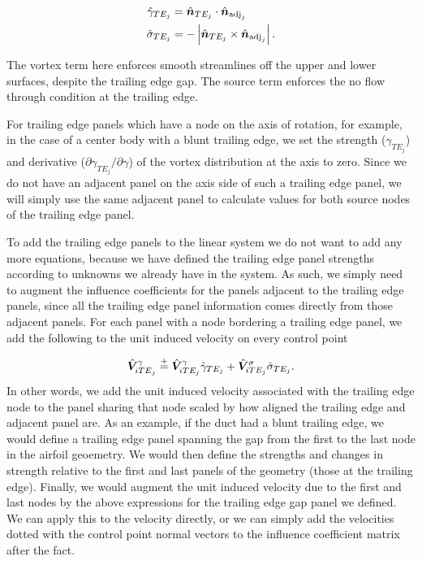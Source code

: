 \begin{align}
        \hat{\gamma}_{TE_j} &= \hat{\bm{n}}_{TE_j} \cdot \hat{\bm{n}}_{\text{adj}_j} \\
        \hat{\sigma}_{TE_j} &= -\left|\hat{\bm{n}}_{TE_j} \times \hat{\bm{n}}_{\text{adj}_j}\right|.
\end{align}

\noindent The vortex term here enforces smooth streamlines off the upper and lower surfaces, despite the trailing edge gap.
%
The source term enforces the no flow through condition at the trailing edge.

For trailing edge panels which have a node on the axis of rotation, for example, in the case of a center body with a blunt trailing edge, we set the strength (\(\gamma_{TE_j}\)) and derivative (\(\partial \gamma_{TE_j}/\partial \gamma\)) of the vortex distribution at the axis to zero.
%
Since we do not have an adjacent panel on the axis side of such a trailing edge panel, we will simply use the same adjacent panel to calculate values for both source nodes of the trailing edge panel. %

To add the trailing edge panels to the linear system we do not want to add any more equations, because we have defined the trailing edge panel strengths according to unknowns we already have in the system.
%
As such, we simply need to augment the influence coefficients for the panels adjacent to the trailing edge panels, since all the trailing edge panel information comes directly from those adjacent panels.
%
For each panel with a node bordering a trailing edge panel, we add the following to the unit induced velocity on every control point

\begin{equation}
    \hat{\bm{V}}^\gamma_{i{TE}_j} \stackrel{+}{=} \hat{\bm{V}}^\gamma_{iTE_j}\hat{\gamma}_{TE_j} + \hat{\bm{V}}^\sigma_{iTE_j}\hat{\sigma}_{TE_j}.
\end{equation}
%
In other words, we add the unit induced velocity associated with the trailing edge node to the panel sharing that node scaled by how aligned the trailing edge and adjacent panel are.
%
As an example, if the duct had a blunt trailing edge, we would define a trailing edge panel spanning the gap from the first to the last node in the airfoil geoemetry.
%
We would then define the strengths and changes in strength relative to the first and last panels of the geometry (those at the trailing edge).
%
Finally, we would augment the unit induced velocity due to the first and last nodes by the above expressions for the trailing edge gap panel we defined.
%
We can apply this to the velocity directly, or we can simply add the velocities dotted with the control point normal vectors to the influence coefficient matrix after the fact.


